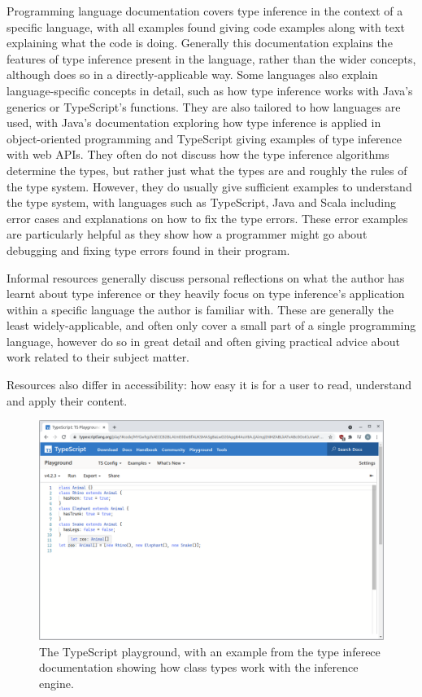 \documentclass[a4paper,fleqn,oneside,12pt]{report}
\begin{document}
Programming language documentation covers type inference in the context of a specific language, with all examples found giving code examples along with text explaining what the code is doing. Generally this documentation explains the features of type inference present in the language, rather than the wider concepts, although does so in a directly-applicable way. Some languages also explain language-specific concepts in detail, such as how type inference works with Java’s generics or TypeScript’s functions. They are also tailored to how languages are used, with Java’s documentation exploring how type inference is applied in object-oriented programming and TypeScript giving examples of type inference with web APIs. They often do not discuss how the type inference algorithms determine the types, but rather just what the types are and roughly the rules of the type system. However, they do usually give sufficient examples to understand the type system, with languages such as TypeScript, Java and Scala including error cases and explanations on how to fix the type errors. These error examples are particularly helpful as they show how a programmer might go about debugging and fixing type errors found in their program.

Informal resources generally discuss personal reflections on what the author has learnt about type inference or they heavily focus on type inference's application within a specific language the author is familiar with. These are generally the least widely-applicable, and often only cover a small part of a single programming language, however do so in great detail and often giving practical advice about work related to their subject matter.

Resources also differ in accessibility: how easy it is for a user to read, understand and apply their content.

\begin{figure}[h!]
  \centering
  \includegraphics[width=\linewidth]{images/image8.png}
  \caption{The TypeScript playground, with an example from the type inferece documentation showing how class types work with the inference engine.}
\end{figure}
\end{document}
